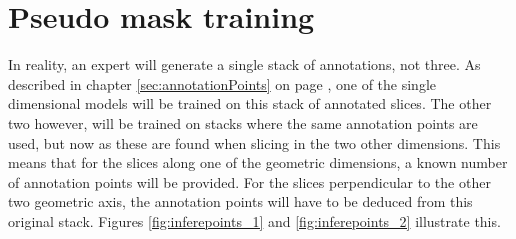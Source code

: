 \chapter{Pseudo mask training}\thispagestyle{empty}
\par{
    In reality, an expert will generate a single stack of annotations, not three.
    As described in chapter \ref{sec:annotationPoints} on page \pageref{sec:annotationPoints}, one of the single dimensional models will be trained on this stack of annotated slices.
    The other two however, will be trained on stacks where the same annotation points are used, but now as these are found when slicing in the two other dimensions.
    This means that for the slices along one of the geometric dimensions, a known number of annotation points will be provided.
    For the slices perpendicular to the other two geometric axis, the annotation points will have to be deduced from this original stack.
    Figures \ref{fig:inferepoints_1} and \ref{fig:inferepoints_2} illustrate this.
}

